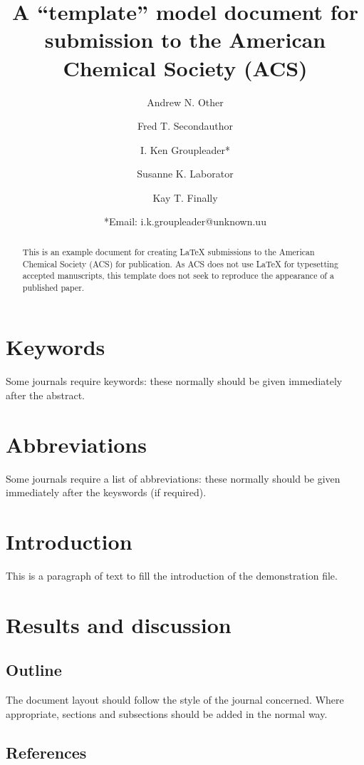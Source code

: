 \documentclass[letterpaper]{article}
\author[1]{Andrew N. Other}
\author[1]{Fred T. Secondauthor}
\author[1]{I. Ken Groupleader*}
\affil[1]{Department of Chemistry, Unknown University, Unknown Town}
\author[2]{Susanne K. Laborator}
\affil[2]{Lead Discovery, BigPharma, Big Town, USA}
\author[1]{Kay T. Finally}
\title{A ``template'' model document for submission to the
  American Chemical Society (ACS)}
\date{*Email: i.k.groupleader@unknown.uu}
\begin{document}
\maketitle

\begin{abstract}
  This is an example document for creating \LaTeX{} submissions to the American
  Chemical Society (ACS) for publication. As ACS does not use \LaTeX{} for
  typesetting accepted manuscripts, this template does not seek to
  reproduce the appearance of a published paper.
\end{abstract}

\section*{Keywords}

Some journals require keywords: these normally should be given immediately
after the abstract.

\section*{Abbreviations}

Some journals require a list of abbreviations: these normally should be given
immediately after the keyswords (if required).

\section{Introduction}

This is a paragraph of text to fill the introduction of the demonstration file. 

\section{Results and discussion}

\subsection{Outline}

The document layout should follow the style of the journal concerned. Where
appropriate, sections and subsections should be added in the normal way.

\subsection{References}
\end{document}
